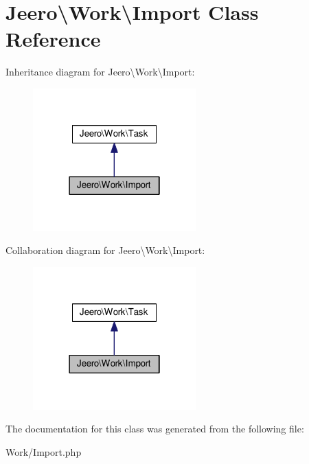 \hypertarget{classJeero_1_1Work_1_1Import}{}\section{Jeero\textbackslash{}Work\textbackslash{}Import Class Reference}
\label{classJeero_1_1Work_1_1Import}


Inheritance diagram for Jeero\textbackslash{}Work\textbackslash{}Import\+:\nopagebreak
\begin{figure}[H]
\begin{center}
\leavevmode
\includegraphics[width=178pt]{classJeero_1_1Work_1_1Import__inherit__graph}
\end{center}
\end{figure}


Collaboration diagram for Jeero\textbackslash{}Work\textbackslash{}Import\+:\nopagebreak
\begin{figure}[H]
\begin{center}
\leavevmode
\includegraphics[width=178pt]{classJeero_1_1Work_1_1Import__coll__graph}
\end{center}
\end{figure}


The documentation for this class was generated from the following file\+:\begin{DoxyCompactItemize}
\item 
Work/Import.\+php\end{DoxyCompactItemize}
